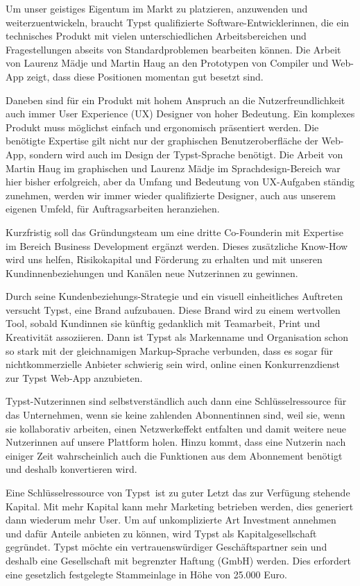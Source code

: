 \documentclass[11pt, a4paper]{article}
\newcommand{\gender}{\raisebox{-.25em}{*}}
\begin{document}
Um unser geistiges Eigentum im Markt zu platzieren, anzuwenden und weiterzuentwickeln, braucht Typst qualifizierte Software-Entwickler\gender{}innen, die ein technisches Produkt mit vielen unterschiedlichen Arbeitsbereichen und Fragestellungen abseits von Standardproblemen bearbeiten können. Die Arbeit von Laurenz Mädje und Martin Haug an den Prototypen von Compiler und Web-App zeigt, dass diese Positionen momentan gut besetzt sind.

Daneben sind für ein Produkt mit hohem Anspruch an die Nutzerfreundlichkeit auch immer User Experience (UX) Designer von hoher Bedeutung. Ein komplexes Produkt muss möglichst einfach und ergonomisch präsentiert werden. Die benötigte Expertise gilt nicht nur der graphischen Benutzeroberfläche der Web-App, sondern wird auch im Design der Typst-Sprache benötigt. Die Arbeit von Martin Haug im graphischen und Laurenz Mädje im Sprachdesign-Bereich war hier bisher erfolgreich, aber da Umfang und Bedeutung von UX-Aufgaben ständig zunehmen, werden wir immer wieder qualifizierte Designer, auch aus unserem eigenen Umfeld, für Auftragsarbeiten heranziehen.

Kurzfristig soll das Gründungsteam um eine\gender{} dritte\gender{} Co-Founder\gender{}in mit Expertise im Bereich Business Development ergänzt werden. Dieses zusätzliche Know-How wird uns helfen, Risikokapital und Förderung zu erhalten und mit unseren Kund\gender{}innenbeziehungen und Kanälen neue Nutzer\gender{}innen zu gewinnen. 

Durch seine Kundenbeziehungs-Strategie und ein visuell einheitliches Auftreten versucht Typst, eine Brand aufzubauen. Diese Brand wird zu einem wertvollen Tool, sobald Kund\gender{}innen sie künftig gedanklich mit Teamarbeit, Print und Kreativität assoziieren. Dann ist Typst als Markenname und Organisation schon so stark mit der gleichnamigen Markup-Sprache verbunden, dass es sogar für nichtkommerzielle Anbieter schwierig sein wird, online einen Konkurrenzdienst zur Typst Web-App anzubieten.

Typst-Nutzer\gender{}innen sind selbstverständlich auch dann eine Schlüsselressource für das Unternehmen, wenn sie keine zahlenden Abonnent\gender{}innen sind, weil sie, wenn sie kollaborativ arbeiten, einen Netzwerkeffekt entfalten und damit weitere neue Nutzer\gender{}innen auf unsere Plattform holen. Hinzu kommt, dass ein\gender{}e Nutzer\gender{}in nach einiger Zeit wahrscheinlich auch die Funktionen aus dem Abonnement benötigt und deshalb konvertieren wird.

Eine Schlüsselressource von Typst ist zu guter Letzt das zur Verfügung stehende Kapital. Mit mehr Kapital kann mehr Marketing betrieben werden, dies generiert dann wiederum mehr User. Um auf unkomplizierte Art Investment annehmen und dafür Anteile anbieten zu können, wird Typst als Kapitalgesellschaft gegründet. Typst möchte ein vertrauenswürdiger Geschäftspartner sein und deshalb eine Gesellschaft mit begrenzter Haftung (GmbH) werden. Dies erfordert eine gesetzlich festgelegte Stammeinlage in Höhe von 25.000 Euro.
\end{document}
